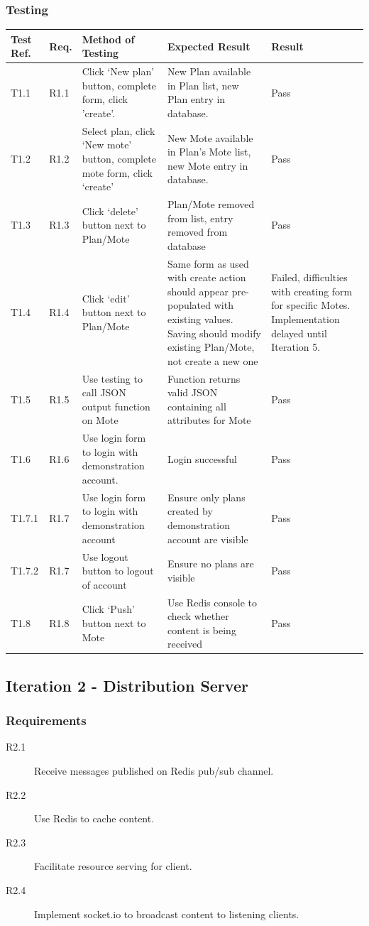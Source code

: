 \documentclass[a4papert,11pt,notitlepage]{article}
\begin{document}
\begin{appendices}
\subsubsection{Testing}
\begin{tabular}{p{30pt} | p{25pt} | p{140pt} | p{140pt} || p{90pt}}
Test Ref. & Req. & Method of Testing & Expected Result & Result \\ \hline
T1.1 & R1.1 & Click `New plan' button, complete form, click 'create'. & New Plan available in Plan list, new Plan entry in database. & Pass \\
T1.2 & R1.2 & Select plan, click `New mote' button, complete mote form, click `create' & New Mote available in Plan's Mote list, new Mote entry in database. & Pass \\
T1.3 & R1.3 & Click `delete' button next to Plan/Mote & Plan/Mote removed from list, entry removed from database & Pass \\
T1.4 & R1.4 & Click `edit' button next to Plan/Mote & Same form as used with create action should appear pre-populated with existing values. Saving should modify existing Plan/Mote, not create a new one & Failed, difficulties with creating form for specific Motes. Implementation delayed until Iteration 5. \\
T1.5 & R1.5 & Use testing to call JSON output function on Mote & Function returns valid JSON containing all attributes for Mote & Pass \\
T1.6 & R1.6 & Use login form to login with demonstration account. & Login successful & Pass \\
T1.7.1 & R1.7 & Use login form to login with demonstration account & Ensure only plans created by demonstration account are visible & Pass \\
T1.7.2 & R1.7 & Use logout button to logout of account & Ensure no plans are visible & Pass \\
T1.8 & R1.8 & Click `Push' button next to Mote & Use Redis console to check whether content is being received & Pass \\
\end{tabular}

\subsection{Iteration 2 - Distribution Server}
\subsubsection{Requirements}
\begin{description}
\item[R2.1] Receive messages published on Redis pub/sub channel.
\item[R2.2] Use Redis to cache content.
\item[R2.3] Facilitate resource serving for client.
\item[R2.4] Implement socket.io to broadcast content to listening clients.
\end{description}


\end{appendices}
\end{document}

